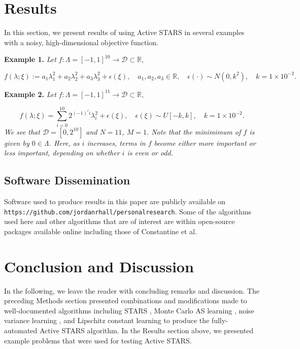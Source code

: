 \documentclass{amsart}
\newcommand{\D}{\mathcal{D}}
\newcommand{\R}{\mathbb{R}}
\begin{document}
\vspace{.25cm}





\section{Results}

In this section, we present results of using Active STARS in several examples with a noisy, high-dimensional objective function.

\noindent \textbf{Example 1.} \textit{Let} $f: \Lambda=[-1,1]^{10} \to \D \subset \mathbb{R},$ 

$$f(\lambda; \xi):=a_1\lambda_{1}^2+a_2\lambda_{2}^2+a_3\lambda_{3}^2 + \epsilon(\xi), \quad a_1,a_2,a_3 \in \R, \quad \epsilon(\cdot) \sim N(0,k^2), \quad k=1 \times 10^{-2}.$$

\noindent \textbf{Example 2.} \textit{Let} $f: \Lambda=[-1,1]^{11} \to \D \subset \R,$  

$$f(\lambda; \xi)=\sum_{i=0}^{10} 2^{(-1)^i i}\lambda_i^2+\epsilon(\xi), \quad \epsilon(\xi) \sim U[-k,k], \quad k=1 \times 10^{-2}.$$ \textit{We see that $\mathcal{D}=[0,2^{10}]$ and $N=11$, $M=1$. Note that the minimimum of $f$ is given by $0 \in \Lambda$. Here, as $i$ increases, terms in $f$ become either more important or less important, depending on whether $i$ is even or odd.}












\subsection{Software Dissemination}

Software used to produce results in this paper are publicly available on \texttt{https://github.com/jordanrhall/personalresearch}. Some of the algorithms used here and other algorithms that are of interest are within open-source packages available online including those of Constantine et al.


\section{Conclusion and Discussion}

In the following, we leave the reader with concluding remarks and discussion. The preceding Methods section presented combinations and modifications made to well-documented algorithms including STARS \cite{CW}, Monte Carlo AS learning \cite{ConstantineMC}, noise variance learning \cite{MW}, and Lipschitz constant learning \cite{Calliess} to produce the fully-automated Active STARS algorithm. In the Results section above, we presented example problems that were used for testing Active STARS.
\end{document}

